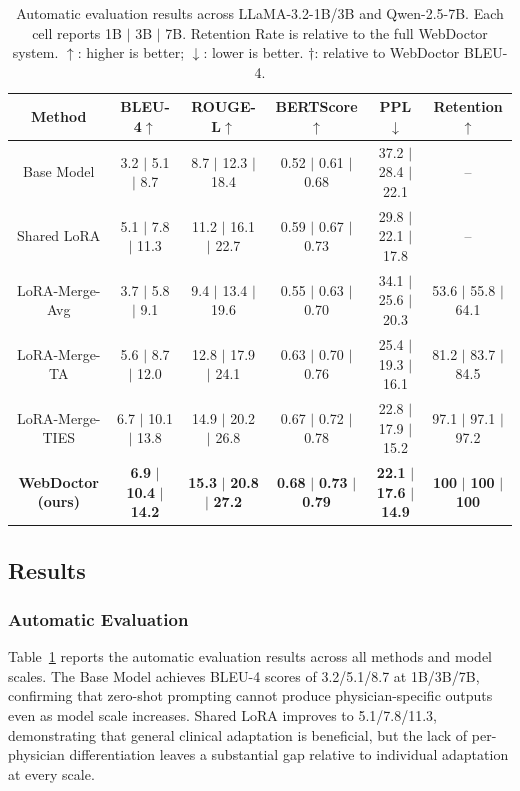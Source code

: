 \begin{table}[!t]
\footnotesize
\setlength{\tabcolsep}{2.5pt}
\renewcommand\arraystretch{1.06}
\centering
\caption{Automatic evaluation results across LLaMA-3.2-1B/3B and Qwen-2.5-7B. Each cell reports 1B $|$ 3B $|$ 7B. Retention Rate is relative to the full WebDoctor system. $\uparrow$: higher is better; $\downarrow$: lower is better. $\dagger$: relative to WebDoctor BLEU-4.}
\label{tab:accuracy}
\begin{tabular}{c|cccc|c}
\toprule
\textbf{Method} & \textbf{BLEU-4}$\uparrow$ & \textbf{ROUGE-L}$\uparrow$ & \textbf{BERTScore}$\uparrow$ & \textbf{PPL}$\downarrow$ & \textbf{Retention}$\uparrow$\\
\midrule
Base Model & 3.2 $|$ 5.1 $|$ 8.7 & 8.7 $|$ 12.3 $|$ 18.4 & 0.52 $|$ 0.61 $|$ 0.68 & 37.2 $|$ 28.4 $|$ 22.1 & --\\
\midrule
Shared LoRA & 5.1 $|$ 7.8 $|$ 11.3 & 11.2 $|$ 16.1 $|$ 22.7 & 0.59 $|$ 0.67 $|$ 0.73 & 29.8 $|$ 22.1 $|$ 17.8 & --\\
\midrule
LoRA-Merge-Avg & 3.7 $|$ 5.8 $|$ 9.1 & 9.4 $|$ 13.4 $|$ 19.6 & 0.55 $|$ 0.63 $|$ 0.70 & 34.1 $|$ 25.6 $|$ 20.3 & 53.6 $|$ 55.8 $|$ 64.1\\
LoRA-Merge-TA & 5.6 $|$ 8.7 $|$ 12.0 & 12.8 $|$ 17.9 $|$ 24.1 & 0.63 $|$ 0.70 $|$ 0.76 & 25.4 $|$ 19.3 $|$ 16.1 & 81.2 $|$ 83.7 $|$ 84.5\\
LoRA-Merge-TIES & 6.7 $|$ 10.1 $|$ 13.8 & 14.9 $|$ 20.2 $|$ 26.8 & 0.67 $|$ 0.72 $|$ 0.78 & 22.8 $|$ 17.9 $|$ 15.2 & 97.1 $|$ 97.1 $|$ 97.2\\
\midrule
\rowcolor{blue!5}
\textbf{WebDoctor (ours)} & \textbf{6.9} $|$ \textbf{10.4} $|$ \textbf{14.2} & \textbf{15.3} $|$ \textbf{20.8} $|$ \textbf{27.2} & \textbf{0.68} $|$ \textbf{0.73} $|$ \textbf{0.79} & \textbf{22.1} $|$ \textbf{17.6} $|$ \textbf{14.9} & \textbf{100} $|$ \textbf{100} $|$ \textbf{100}\\
\bottomrule
\end{tabular}
\end{table}


\subsection{Results}

\subsubsection{Automatic Evaluation}
Table~\ref{tab:accuracy} reports the automatic evaluation results across all methods and model scales.
The Base Model achieves BLEU-4 scores of 3.2/5.1/8.7 at 1B/3B/7B, confirming that zero-shot prompting cannot produce physician-specific outputs even as model scale increases.
Shared LoRA improves to 5.1/7.8/11.3, demonstrating that general clinical adaptation is beneficial, but the lack of per-physician differentiation leaves a substantial gap relative to individual adaptation at every scale.


